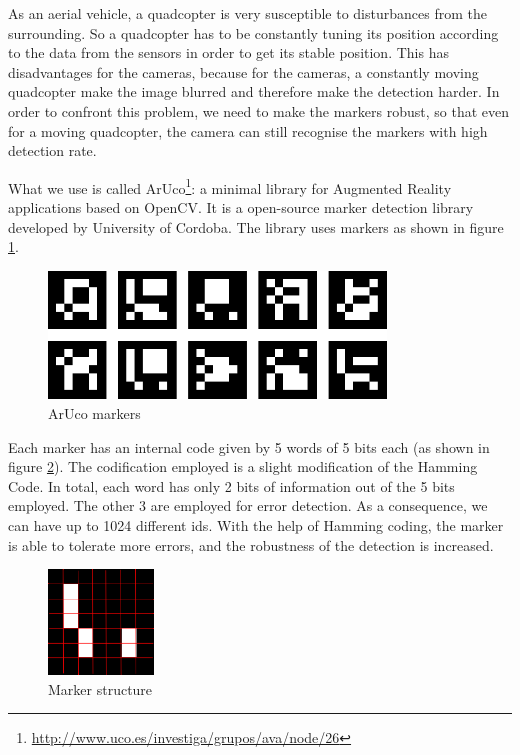 \documentclass[11pt, a4paper, onecolumn, oneside, parskip=half]{scrartcl}
\begin{document}
As an aerial vehicle, a quadcopter is very susceptible to disturbances from the surrounding. So a quadcopter has to be constantly tuning its position according to the data from the sensors in order to get its stable position. This has disadvantages for the cameras, because for the cameras, a constantly moving quadcopter make the image blurred and therefore make the detection harder. In order to confront this problem, we need to make the markers robust, so that even for a moving quadcopter, the camera can still recognise the markers with high detection rate.

What we use is called ArUco\footnote{\url{http://www.uco.es/investiga/grupos/ava/node/26}}: a minimal library for Augmented Reality applications based on OpenCV. It is a open-source marker detection library developed by University of Cordoba. The library uses markers as shown in figure \ref{fig:markers}.

\begin{figure}[ht]
\centering
\includegraphics[width=0.8\textwidth]{image00}
\caption{ArUco markers}
\label{fig:markers}
\end{figure}

Each marker has an internal code given by 5 words of 5 bits each (as shown in figure \ref{fig:markerstructure}). The codification employed is a slight modification of the Hamming Code. In total, each word has only 2 bits of information out of the 5 bits employed. The other 3 are employed for error detection. As a consequence, we can have up to 1024 different ids. With the help of Hamming coding, the marker is able to tolerate more errors, and the robustness of the detection is increased.

\begin{figure}[ht]
\centering
\includegraphics[width=0.25\textwidth]{image04}
\caption{Marker structure}
\label{fig:markerstructure}
\end{figure}
\end{document}
